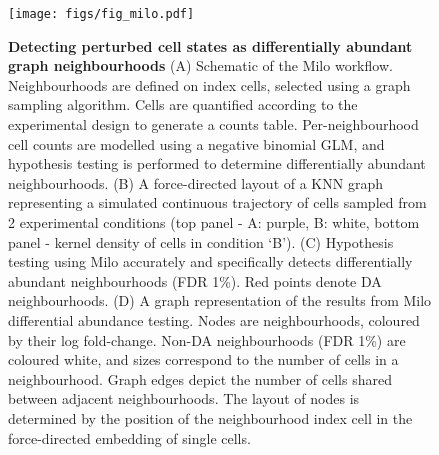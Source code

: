 \documentclass[
  10pt,
]{article}
\author{}
\date{\vspace{-2.5em}}
\begin{document}

\newpage

\begin{figure}
\centering
\texttt{[image: figs/fig\_milo.pdf]}
\caption{\label{fig:fig-1}\textbf{Detecting perturbed cell states as differentially abundant graph neighbourhoods}
(A) Schematic of the Milo workflow.
Neighbourhoods are defined on index cells, selected using a graph sampling algorithm.
Cells are quantified according to the experimental design to generate a counts table. Per-neighbourhood cell counts are modelled using a negative binomial GLM, and hypothesis testing is performed to determine differentially abundant neighbourhoods.
(B) A force-directed layout of a KNN graph representing a simulated continuous trajectory of cells sampled from 2 experimental conditions (top panel - A: purple, B: white, bottom panel - kernel density of cells in condition `B').
(C) Hypothesis testing using Milo accurately and specifically detects differentially abundant neighbourhoods (FDR 1\%). Red points denote DA neighbourhoods.
(D)
A graph representation of the results from Milo differential abundance testing. Nodes are neighbourhoods, coloured by their log fold-change. Non-DA neighbourhoods (FDR 1\%) are coloured white, and sizes correspond to the number of cells in a neighbourhood. Graph edges depict the number of cells shared between adjacent neighbourhoods. The layout of nodes is determined by the position of the neighbourhood index cell in the force-directed embedding of single cells.}
\end{figure}
\end{document}
